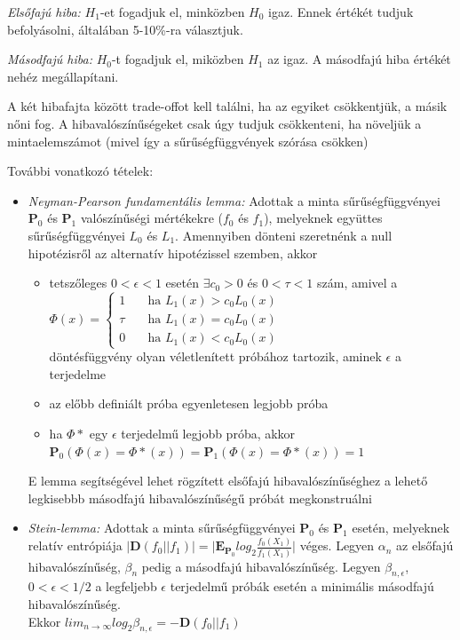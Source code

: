 \emph{Elsőfajú hiba:} $H_1$-et fogadjuk el, minközben $H_0$ igaz. Ennek értékét tudjuk befolyásolni, általában 5-10\%-ra választjuk.

\emph{Másodfajú hiba:} $H_0$-t fogadjuk el, miközben $H_1$ az igaz. A másodfajú hiba értékét nehéz megállapítani.

A két hibafajta között trade-offot kell találni, ha az egyiket csökkentjük, a másik nőni fog. A hibavalószínűségeket csak úgy tudjuk csökkenteni, ha növeljük a mintaelemszámot (mivel így a sűrűségfüggvények szórása csökken)

További vonatkozó tételek:
\begin{itemize}
\item \emph{Neyman-Pearson fundamentális lemma:}  Adottak a minta sűrűségfüggvényei $\mathbf{P}_0$ és $\mathbf{P}_1$ valószínűségi mértékekre ($f_0$ és $f_1$), melyeknek együttes sűrűségfüggvényei $L_0$ és $L_1$. Amennyiben dönteni szeretnénk a null hipotézisről az alternatív hipotézissel szemben, akkor
\begin{itemize}
\item tetszőleges $0<\epsilon<1$ esetén $\exists c_0 >0$ és $0 < \tau < 1$ szám, amivel a \\
$\Phi(x) = 
  \begin{cases}
    1       & \quad \text{ha } L_1(x) > c_0L_0(x) \\
    \tau    & \quad \text{ha } L_1(x) = c_0L_0(x)\\
    0		& \quad \text{ha } L_1(x) < c_0L_0(x)
  \end{cases}
$
\\döntésfüggvény olyan véletlenített próbához tartozik, aminek $\epsilon$ a terjedelme
\item az előbb definiált próba egyenletesen legjobb próba
\item ha $\Phi*$ egy $\epsilon$ terjedelmű legjobb próba, akkor \\$\mathbf{P}_0(\Phi(x) = \Phi*(x))=\mathbf{P}_1(\Phi(x) = \Phi*(x))=1$
\end{itemize}
E lemma segítségével lehet rögzített elsőfajú hibavalószínűséghez a lehető legkisebbb másodfajú hibavalószínűségű próbát megkonstruálni

\item \emph{Stein-lemma:} Adottak a minta sűrűségfüggvényei $\mathbf{P}_0$ és $\mathbf{P}_1$ esetén, melyeknek relatív entrópiája $| \mathbf{D} (f_0 || f_1)| = \Big| \mathbf{E}_{\mathbf{P}_0}log_2\frac{f_0(X_1)}{f_1(X_1)} \Big|$ véges. Legyen $\alpha_n$ az elsőfajú hibavalószínűség, $\beta_n$ pedig a másodfajú hibavalószínűség. Legyen $\beta_{n,\epsilon}$, $0<\epsilon<1/2$ a legfeljebb $\epsilon$ terjedelmű próbák esetén a minimális másodfajú hibavalószínűség.\\Ekkor $lim_{n\rightarrow\infty}log_2\beta_{n,\epsilon} = - \mathbf{D} (f_0 || f_1)$
\end{itemize}

